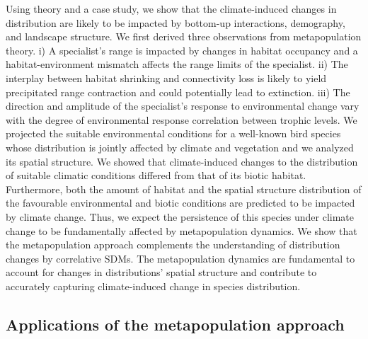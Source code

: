 \documentclass[12pt]{article}
\begin{document}
Using theory and a case study, we show that the climate-induced changes
in distribution are likely to be impacted by bottom-up interactions,
demography, and landscape structure. We first derived three observations
from metapopulation theory. i) A specialist's range is impacted by
changes in habitat occupancy and a habitat-environment mismatch affects
the range limits of the specialist. ii) The interplay between habitat
shrinking and connectivity loss is likely to yield precipitated range
contraction and could potentially lead to extinction. iii) The direction
and amplitude of the specialist's response to environmental change vary
with the degree of environmental response correlation between trophic
levels. We projected the suitable environmental conditions for a
well-known bird species whose distribution is jointly affected by
climate and vegetation and we analyzed its spatial structure. We showed
that climate-induced changes to the distribution of suitable climatic
conditions differed from that of its biotic habitat. Furthermore, both
the amount of habitat and the spatial structure distribution of the
favourable environmental and biotic conditions are predicted to be
impacted by climate change. Thus, we expect the persistence of this
species under climate change to be fundamentally affected by
metapopulation dynamics. We show that the metapopulation approach
complements the understanding of distribution changes by correlative
SDMs. The metapopulation dynamics are fundamental to account for changes
in distributions' spatial structure and contribute to accurately
capturing climate-induced change in species distribution.

\hypertarget{applications-of-the-metapopulation-approach}{%
\subsection{Applications of the metapopulation
approach}\label{applications-of-the-metapopulation-approach}}
\end{document}
